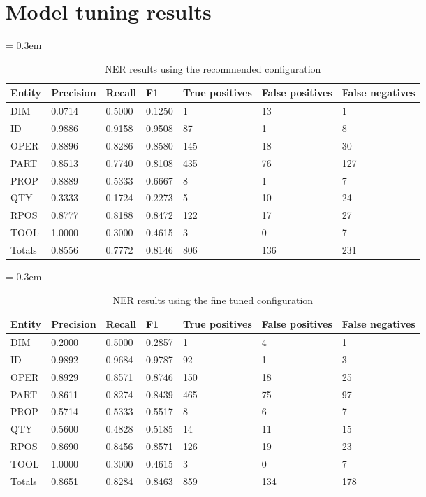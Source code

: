 \section{Model tuning results}\label{sec:model-tuning-results}


\begin{table}[ht]
	\caption{NER results using the recommended configuration}
	\tabulinesep = 0.3em
	\setlength{\tabcolsep}{0.2em}
	\centering
	\begin{tabu} { X[c,m] X[r,m] X[r,m] X[r,m] X[r,m] X[r,m] X[r,m] }
		\rowfont{\bfseries\itshape} Entity & Precision & Recall & F1 & True positives & False positives & False negatives \\
		\hline
		DIM & 0.0714 & 0.5000 & 0.1250 & 1 & 13 & 1 \\
		ID & 0.9886 & 0.9158 & 0.9508 & 87 & 1 & 8 \\
		OPER & 0.8896 & 0.8286 & 0.8580 & 145 & 18 & 30 \\
		PART & 0.8513 & 0.7740 & 0.8108 & 435 & 76 & 127 \\
		PROP & 0.8889 & 0.5333 & 0.6667 & 8 & 1 & 7 \\
		QTY & 0.3333 & 0.1724 & 0.2273 & 5 & 10 & 24 \\
		RPOS & 0.8777 & 0.8188 & 0.8472 & 122 & 17 & 27 \\
		TOOL & 1.0000 & 0.3000 & 0.4615 & 3 & 0 & 7 \\
		\rowfont{\bfseries} Totals & 0.8556 & 0.7772 & 0.8146 & 806 & 136 & 231 \\
	\end{tabu}
	\label{tab:results_recommended-configuration}
\end{table}


\begin{table}[ht]
	\caption{NER results using the fine tuned configuration}
	\tabulinesep = 0.3em
	\setlength{\tabcolsep}{0.2em}
	\centering
	\begin{tabu} { X[c,m] X[r,m] X[r,m] X[r,m] X[r,m] X[r,m] X[r,m] }
		\rowfont{\bfseries\itshape} Entity & Precision & Recall & F1 & True positives & False positives & False negatives \\
		\hline
		DIM & 0.2000 & 0.5000 & 0.2857 & 1 & 4 & 1 \\
		ID & 0.9892 & 0.9684 & 0.9787 & 92 & 1 & 3 \\
		OPER & 0.8929 & 0.8571 & 0.8746 & 150 & 18 & 25 \\
		PART & 0.8611 & 0.8274 & 0.8439 & 465 & 75 & 97 \\
		PROP & 0.5714 & 0.5333 & 0.5517 & 8 & 6 & 7 \\
		QTY & 0.5600 & 0.4828 & 0.5185 & 14 & 11 & 15 \\
		RPOS & 0.8690 & 0.8456 & 0.8571 & 126 & 19 & 23 \\
		TOOL & 1.0000 & 0.3000 & 0.4615 & 3 & 0 & 7 \\
		\rowfont{\bfseries} Totals & 0.8651 & 0.8284 & 0.8463 & 859 & 134 & 178 \\
	\end{tabu}
	\label{tab:results_optimal-configuration}
\end{table}
